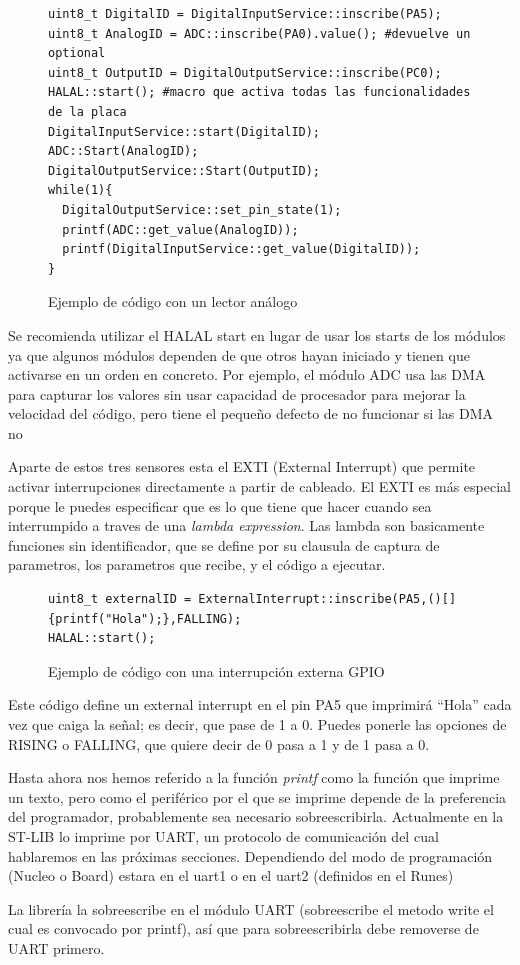 \documentclass{report}
\begin{document}
\begin{figure}[h]
\begin{lstlisting}
uint8_t DigitalID = DigitalInputService::inscribe(PA5);
uint8_t AnalogID = ADC::inscribe(PA0).value(); #devuelve un optional
uint8_t OutputID = DigitalOutputService::inscribe(PC0);
HALAL::start(); #macro que activa todas las funcionalidades de la placa
DigitalInputService::start(DigitalID);
ADC::Start(AnalogID);
DigitalOutputService::Start(OutputID);
while(1){
  DigitalOutputService::set_pin_state(1);
  printf(ADC::get_value(AnalogID));
  printf(DigitalInputService::get_value(DigitalID));
}
\end{lstlisting}
\caption{Ejemplo de código con un lector análogo}
  \label{Analogcode}
\end{figure}
\par \vspace{0.3 cm}
Se recomienda utilizar el HALAL start en lugar de usar los starts de los módulos ya que algunos módulos dependen de que otros hayan iniciado y tienen que activarse en un orden en concreto. Por ejemplo, el módulo ADC usa las DMA para capturar los valores sin usar capacidad de procesador para mejorar la velocidad del código, pero tiene el pequeño defecto de no funcionar si las DMA no 
\par \vspace{0.3 cm}
Aparte de estos tres sensores esta el EXTI (External Interrupt) que permite activar interrupciones directamente a partir de cableado. El EXTI es más especial porque le puedes especificar que es lo que tiene que hacer cuando sea interrumpido a traves de una \textit{lambda expression}. Las lambda son basicamente funciones sin identificador, que se define por su clausula de captura de parametros, los parametros que recibe, y el código a ejecutar. 
\begin{figure}[h]
\begin{lstlisting}
uint8_t externalID = ExternalInterrupt::inscribe(PA5,()[]{printf("Hola");},FALLING);
HALAL::start();
\end{lstlisting} 
\caption{Ejemplo de código con una interrupción externa GPIO}
  \label{EXTIcode}
\end{figure}
\par \vspace{0.3 cm}
Este código define un external interrupt en el pin PA5 que imprimirá ``Hola'' cada vez que caiga la señal; es decir, que pase de 1 a 0. Puedes ponerle las opciones de RISING o FALLING, que quiere decir de 0 pasa a 1 y de 1 pasa a 0. \par\vspace{0.3 cm}
Hasta ahora nos hemos referido a la función \textit{printf} como la función que imprime un texto, pero como el periférico por el que se imprime depende de la preferencia del programador, probablemente sea necesario sobreescribirla. Actualmente en la ST-LIB lo imprime por UART, un protocolo de comunicación del cual hablaremos en las próximas secciones. Dependiendo del modo de programación (Nucleo o Board) estara en el uart1 o en el uart2 (definidos en el Runes) \par
La librería la sobreescribe en el módulo UART (sobreescribe el metodo write el cual es convocado por printf), así que para sobreescribirla debe removerse de UART primero.
\end{document}
